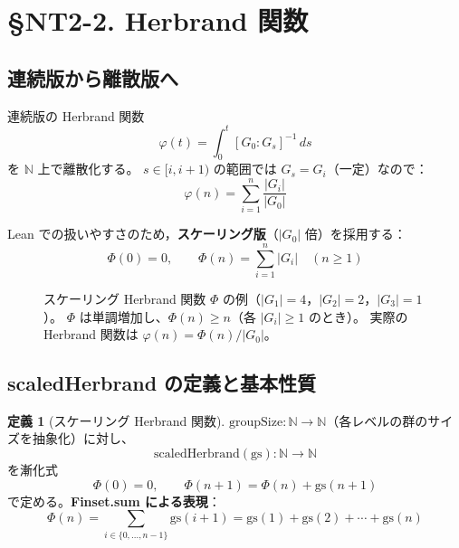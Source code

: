 \documentclass[a4paper,11pt]{ltjsarticle}
\theoremstyle{definition}
\newtheorem{definition}{定義}[section]
\theoremstyle{plain}
\theoremstyle{remark}
\newcommand{\Phi}{\varPhi}
\begin{document}
\section{\S NT2-2. Herbrand 関数}

\subsection{連続版から離散版へ}

連続版の Herbrand 関数
\[
  \varphi(t) = \int_0^t [G_0 : G_s]^{-1}\,ds
\]
を $\mathbb{N}$ 上で離散化する。
$s \in [i, i+1)$ の範囲では $G_s = G_i$（一定）なので：
\[
  \varphi(n) = \sum_{i=1}^{n} \frac{|G_i|}{|G_0|}
\]

Lean での扱いやすさのため，\textbf{スケーリング版}（$|G_0|$ 倍）を採用する：
\[
  \Phi(0) = 0, \qquad \Phi(n) = \sum_{i=1}^{n} |G_i| \quad (n \geq 1)
\]

\begin{figure}[H]
\centering
{}
\caption{スケーリング Herbrand 関数 $\Phi$ の例（$|G_1|=4$，$|G_2|=2$，$|G_3|=1$）。
$\Phi$ は単調増加し、$\Phi(n) \geq n$（各 $|G_i| \geq 1$ のとき）。
実際の Herbrand 関数は $\varphi(n) = \Phi(n)/|G_0|$。}
\label{fig:herbrand-function}
\end{figure}

\subsection{scaledHerbrand の定義と基本性質}

\begin{definition}[スケーリング Herbrand 関数]\label{def:scaled-herbrand}
  $\mathrm{groupSize}\colon \mathbb{N} \to \mathbb{N}$（各レベルの群のサイズを抽象化）に対し、
  \[
    \mathrm{scaledHerbrand}(\mathrm{gs})\colon \mathbb{N} \to \mathbb{N}
  \]
  を漸化式
  \[
    \Phi(0) = 0, \qquad \Phi(n+1) = \Phi(n) + \mathrm{gs}(n+1)
  \]
  で定める。\textbf{Finset.sum による表現}：
  \[
    \Phi(n) = \sum_{i \in \{0,\ldots,n-1\}} \mathrm{gs}(i+1)
    = \mathrm{gs}(1) + \mathrm{gs}(2) + \cdots + \mathrm{gs}(n)
  \]
\end{definition}
\end{document}
